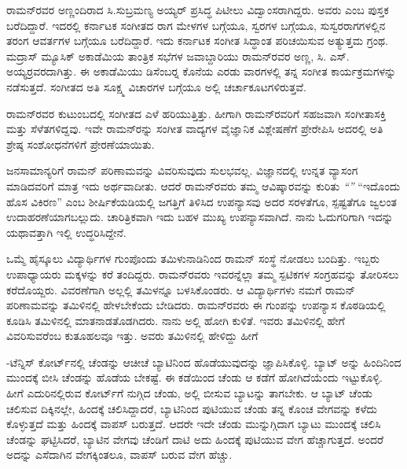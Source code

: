 ರಾಮನ್‍ರವರ ಅಣ್ಣಂದಿರಾದ ಸಿ.ಸುಬ್ರಮಣ್ಯ ಅಯ್ಯರ್ ಪ್ರಸಿದ್ಧ ಪಿಟೀಲು ವಿದ್ವಾಂಸರಾಗಿದ್ದರು. ಅವರು \textit{} ಎಂಬ ಪುಸ್ತಕ ಬರೆದಿದ್ದಾರೆ. ಇದರಲ್ಲಿ ಕರ್ನಾಟಕ ಸಂಗೀತದ ರಾಗ ಮೇಳಗಳ ಬಗ್ಗೆಯೂ, ಸ್ವರಗಳ ಬಗ್ಗೆಯೂ, ಸುಸ್ವರರಾಗಗಳಲ್ಲಿನ ತರಂಗ ಆವರ್ತಗಳ ಬಗ್ಗೆಯೂ ಬರೆದಿದ್ದಾರೆ. ಇದು ಕರ್ನಾಟಕ ಸಂಗೀತ ಸಿದ್ಧಾಂತ ಪರಿಚಯಿಸುವ ಅತ್ಯುತ್ತಮ ಗ್ರಂಥ. ಮದ್ರಾಸ್ ಮ್ಯೂಸಿಕ್ ಅಕಾಡೆಮಿಯ ತಾಂತ್ರಿಕ ಸಭೆಗಳ ಜವಾಬ್ದಾರಿಯು ರಾಮನ್‍ರವರ ಅಣ್ಣ, ಸಿ. ಎಸ್. ಅಯ್ಯರ್‍ರವರದಾಗಿತ್ತು. ಈ ಅಕಾಡೆಮಿಯು ಡಿಸೆಂಬರ್‍ನ ಕೊನೆಯ ಎರಡು ವಾರಗಳಲ್ಲಿ ತನ್ನ ಸಂಗೀತ ಕಾರ್ಯಕ್ರಮಗಳನ್ನು ನಡೆಸುತ್ತದೆ. ಸಂಗೀತದ ಅತಿ ಸೂಕ್ಷ್ಮ ವಿಚಾರಗಳ ಬಗ್ಗೆಯೂ ಅಲ್ಲಿ ಚರ್ಚಾಕೂಟಗಳಿರುತ್ತವೆ.

ರಾಮನ್‍ರವರ ಕುಟುಂಬದಲ್ಲಿ ಸಂಗೀತದ ಎಳೆ ಹರಿಯುತ್ತಿತ್ತು. ಹೀಗಾಗಿ ರಾಮನ್‍ರವರಿಗೆ ಸಹಜವಾಗಿ ಸಂಗೀತಾಸಕ್ತಿ ಮತ್ತು ಸೆಳೆತಗಳಿದ್ದವು. ಇವೇ ರಾಮನ್‍ರನ್ನು ಸಂಗೀತ ವಾದ್ಯಗಳ ವೈಜ್ಞಾನಿಕ ವಿಶ್ಲೇಷಣೆಗೆ ಪ್ರೇರೇಪಿಸಿ ಅದರಲ್ಲಿ ಅತಿ ಶ್ರೇಷ್ಠ ಸಂಶೋಧನೆಗಳಿಗೆ ಪ್ರೇರಣೆಯಾಯಿತು.



ಜನಸಾಮಾನ್ಯರಿಗೆ ರಾಮನ್ ಪರಿಣಾಮವನ್ನು ವಿವರಿಸುವುದು ಸುಲಭವಲ್ಲ. ವಿಜ್ಞಾನದಲ್ಲಿ ಉನ್ನತ ವ್ಯಾಸಂಗ ಮಾಡಿದವರಿಗೆ ಮಾತ್ರ ಇದು ಅರ್ಥವಾದೀತು. ಆದರೆ ರಾಮನ್‍ರವರು ತಮ್ಮ ಆವಿಷ್ಕಾರವನ್ನು ಕುರಿತು \textit{“”} “ಇದೊಂದು ಹೊಸ ವಿಕಿರಣ” ಎಂಬ ಶೀರ್ಷಿಕೆಯಡಿಯಲ್ಲಿ ಜಗತ್ತಿಗೆ ತಿಳಿಸಿದ ಉಪನ್ಯಾಸವು ಅದರ ಸರಳತೆಗೂ, ಸ್ಪಷ್ಟತೆಗೂ ಜ್ವಲಂತ ಉದಾಹರಣೆಯಾಗಬಲ್ಲುದು. ಚಾರಿತ್ರಿಕವಾಗಿ ಇದು ಬಹಳ ಮುಖ್ಯ ಉಪನ್ಯಾಸವಾಗಿದೆ. ನಾನು ಓದುಗರಿಗಾಗಿ ಇದನ್ನು ಯಥಾವತ್ತಾಗಿ ಇಲ್ಲಿ ಉದ್ಧರಿಸಿದ್ದೇನೆ.

ಒಮ್ಮೆ ಹೈಸ್ಕೂಲು ವಿದ್ಯಾರ್ಥಿಗಳ ಗುಂಪೊಂದು ತಮಿಳುನಾಡಿನಿಂದ ರಾಮನ್ ಸಂಸ್ಥೆ ನೋಡಲು ಬಂದಿತ್ತು. ಇಬ್ಬರು ಉಪಾಧ್ಯಾಯರು  ಮಕ್ಕಳನ್ನು ಕರೆ ತಂದಿದ್ದರು. ರಾಮನ್‍ರವರು ಇವರನ್ನೆಲ್ಲಾ ತಮ್ಮ ಸ್ಪಟಿಕಗಳ ಸಂಗ್ರಹವನ್ನು ತೋರಿಸಲು ಕರೆದೊಯ್ದರು. ವಿವರಣೆಗಾಗಿ ಅಲ್ಲಲ್ಲಿ ತಮಿಳನ್ನೂ ಬಳಸಿಕೊಂಡರು. ಆ ವಿದ್ಯಾರ್ಥಿಗಳು ನಮಗೆ ರಾಮನ್ ಪರಿಣಾಮವನ್ನು ತಮಿಳಿನಲ್ಲಿ ಹೇಳಬೇಕೆಂದು ಬೇಡಿದರು. ರಾಮನ್‍ರವರು ಈ ಗುಂಪನ್ನು ಉಪನ್ಯಾಸ ಕೊಠಡಿಯಲ್ಲಿ ಕೂಡಿಸಿ ತಮಿಳಿನಲ್ಲಿ ಮಾತನಾಡತೊಡಗಿದರು. ನಾನು ಅಲ್ಲಿ ಹೋಗಿ ಕುಳಿತೆ. ಇವರು ತಮಿಳಿನಲ್ಲಿ ಹೇಗೆ ವಿವರಿಸುವರೆಂಬ ಕುತೂಹಲವೂ ಇತ್ತು. ಅವರು ತಮಿಳಿನಲ್ಲಿ ಹೇಳಿದ್ದು ಹೀಗೆ

-ಟೆನ್ನಿಸ್ ಕೋರ್ಟ್‌ನಲ್ಲಿ ಚೆಂಡನ್ನು ಆಚೀಚೆ ಬ್ಯಾಟಿನಿಂದ ಹೊಡೆಯುವುದನ್ನು ಜ್ಞಾಪಿಸಿಕೊಳ್ಳಿ. ಬ್ಯಾಟ್ ಅನ್ನು ಹಿಂದಿನಿಂದ ಮುಂದಕ್ಕೆ ಬೀಸಿ ಚೆಂಡನ್ನು ಹೊಡೆಯ ಬೇಕಷ್ಟೆ. ಈ ಕಡೆಯಿಂದ ಚೆಂಡು ಆ ಕಡೆಗೆ ಹೋಗಿದೆಯೆಂದು ಇಟ್ಟುಕೊಳ್ಳಿ. ಹೀಗೆ ಎದುರಿನಲ್ಲಿರುವ ಕೋರ್ಟ್‌ಗೆ ನುಗ್ಗಿದ ಚೆಂಡು, ಅಲ್ಲಿ ಬೀಸುವ ಬ್ಯಾಟನ್ನು ತಾಗಬೇಕು. ಆ ಬ್ಯಾಟ್ ಚೆಂಡು ಚಲಿಸುವ ದಿಕ್ಕಿನಲ್ಲೇ, ಹಿಂದಕ್ಕೆ ಚಲಿಸಿದ್ದಾದರೆ, ಬ್ಯಾಟಿನಿಂದ ಪುಟಿಯುವ ಚೆಂಡು ತನ್ನ ಕೊಂಚ ವೇಗವನ್ನು ಕಳೆದು ಕೊಳ್ಳುತ್ತದೆ ಮತ್ತು ಹಿಂದಕ್ಕೆ ವಾಪಸ್ ಬರುತ್ತದೆ. ಆದರೇ ಇದೇ ಚೆಂಡು ಮುನ್ನುಗ್ಗಿದಾಗ ಬ್ಯಾಟು ಮುಂದಕ್ಕೆ ಚಲಿಸಿ ಚೆಂಡನ್ನು ಘಟ್ಟಿಸಿದರೆ, ಬ್ಯಾಟಿನ ವೇಗವು ಚೆಂಡಿಗೆ ದಾಟಿ ಅದು ಹಿಂದಕ್ಕೆ ಪುಟಿಯುವ ವೇಗ ಹೆಚ್ಚಾಗುತ್ತದೆ. ಅಂದರೆ ಅದನ್ನು ಎಸೆದಾಗಿನ ವೇಗಕ್ಕಿಂತಲೂ, ವಾಪಸ್ ಬರುವ ವೇಗ ಹೆಚ್ಚು.

